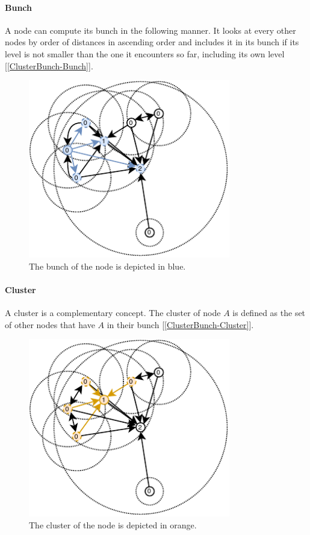 \documentclass[a4paper,11pt,oneside]{report}
\begin{document}
\paragraph{Bunch} A node can compute its bunch in the following manner. It
looks at every other nodes by order of distances in ascending order and
includes it in its bunch if its level is not smaller than the one it encounters
so far, including its own level [\autoref{ClusterBunch-Bunch}]. 

\begin{figure}[!h] 
\centering
\includegraphics[width=250pt]{figures/ClusterBunch-Bunch}
\caption{ The bunch of the node is depicted in blue. }
\label{fig:ClusterBunch-Bunch}
\end{figure}

\paragraph{Cluster} A cluster is a complementary concept. The cluster of node
$A$ is defined as the set of other nodes that have $A$ in their bunch [\autoref{ClusterBunch-Cluster}]. 

\begin{figure}[!h] 
\centering
\includegraphics[width=250pt]{figures/ClusterBunch-Cluster}
\caption{ The cluster of the node is depicted in orange. }
\label{fig:ClusterBunch-Cluster}
\end{figure}
\end{document}
